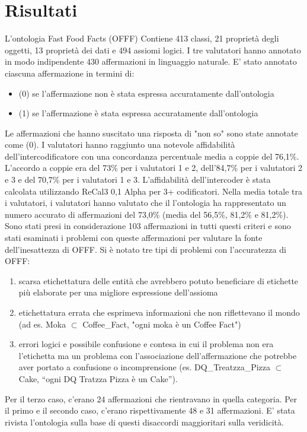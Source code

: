 \section{Risultati}
L'ontologia Fast Food Facts (OFFF) Contiene 413 classi, 21 proprietà degli oggetti, 13 proprietà dei dati e 494 assiomi logici. I tre valutatori hanno annotato in modo indipendente 430 affermazioni in linguaggio naturale. E' stato annotato ciascuna affermazione in termini di:
\begin{itemize}
    \item (0) se l'affermazione non è stata espressa accuratamente dall'ontologia
    \item (1) se l'affermazione è stata espressa accuratamente dall'ontologia
\end{itemize}
Le affermazioni che hanno suscitato una risposta di "non so" sono state annotate come (0). I valutatori hanno raggiunto una notevole affidabilità dell'intercodificatore con una concordanza percentuale media a coppie del 76,1\%. 
L'accordo a coppie era del 73\% per i valutatori 1 e 2, dell'84,7\% per i valutatori 2 e 3 e del 70,7\% per i valutatori 1 e 3. 
L'affidabilità dell'intercoder è stata calcolata utilizzando ReCal3 0,1 Alpha per 3+ codificatori. 
Nella media totale tra i valutatori, i valutatori hanno valutato che il l'ontologia ha rappresentato un numero accurato di affermazioni del 73,0\% (media del 56,5\%, 81,2\% e 81,2\%). 
Sono stati presi in considerazione 103 affermazioni in tutti questi criteri e sono stati esaminati i problemi con queste affermazioni per valutare la fonte dell'inesattezza di OFFF. 
Si è notato tre tipi di problemi con l'accuratezza di OFFF: 
\begin{enumerate}
    \item scarsa etichettatura delle entità che avrebbero potuto beneficiare di etichette più elaborate per una migliore espressione dell'assioma
    \item etichettatura errata che esprimeva informazioni che non riflettevano il mondo (ad es. Moka $\subset$ Coffee\_Fact, "ogni moka è un Coffee Fact")
    \item errori logici e possibile confusione e contesa in cui il problema non era l'etichetta ma un problema con l'associazione dell'affermazione che potrebbe aver portato a confusione o incomprensione (es. DQ\_Treatzza\_Pizza $\subset$ Cake, “ogni DQ Tratzza Pizza è un Cake”).
\end{enumerate}
Per il terzo caso, c'erano 24 affermazioni che rientravano in quella categoria. Per il primo e il secondo caso, c'erano rispettivamente 48 e 31 affermazioni. E' stata rivista l'ontologia sulla base di questi disaccordi maggioritari sulla veridicità. 
